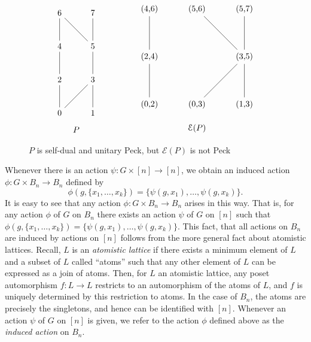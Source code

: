 \documentclass[smallextended]{svjour3}       %
\numberwithin{equation}{section}
\begin{document}
\begin{figure}[h]
\label{fig:dual_not_unimodal}
\[
\begin{tikzpicture}[scale = .7]
  \node (0) at (0,0) {0};
  \node (1) at (2,0) {1};
  \node (2) at (0,2) {2};
  \node (3) at (2,2) {3};
  \node (4) at (0,4) {4};
  \node (5) at (2,4) {5};
  \node (6) at (0,6) {6};
  \node (7) at (2,6) {7};
  \draw (0)--(2);
  \draw (0)--(3);
  \draw (1)--(3);
  \draw (2)--(4);
  \draw (3)--(5);
  \draw (4)--(6);
  \draw (5)--(6);
  \draw (5)--(7);
  \node (8) at (1,-1) {$P$};
\end{tikzpicture}\qquad \hspace{10mm}
\begin{tikzpicture}
  \node (02) at (0,0) {(0,2)};
  \node (03) at (2,0) {(0,3)};
  \node (13) at (4,0) {(1,3)};
  \node (24) at (0,2) {(2,4)};
  \node (35) at (4,2) {(3,5)};
  \node (46) at (0,4) {(4,6)};
  \node (56) at (2,4) {(5,6)};
  \node (57) at (4,4) {(5,7)};
  \draw (02)--(24);
  \draw (03)--(35);
  \draw (13)--(35);
  \draw (24)--(46);
  \draw (35)--(56);
  \draw (35)--(57);
  \node (0) at (2,-1) {$\mathcal{E}(P)$};
\end{tikzpicture}\]
\caption{$P$ is self-dual and unitary Peck, but $\mathcal{E}(P)$ is not Peck}
\end{figure}


\begin{remark}
\label{rem:induced_action_bn}
Whenever there is an action $\psi\colon G \times [n] \rightarrow [n]$, we obtain an induced action $\phi: G \times B_n \rightarrow B_n$ defined by
$$\phi(g,\{x_1,\ldots, x_k\}) = \{\psi(g,x_1),\ldots, \psi(g,x_k)\}.$$
It is easy to see that any action $\phi\colon G \times B_n \rightarrow B_n$ arises in this way. That is, for any action $\phi$ of $G$ on $B_n$ there exists an action $\psi$ of $G$ on $[n]$ such that $\phi(g,\{x_1,\ldots, x_k\}) = \{\psi(g,x_1),\ldots, \psi(g,x_k)\}$. This fact, that all actions on $B_n$ are induced by actions on $[n]$ follows from the more general fact about atomistic lattices. Recall, $L$ is an {\it atomistic lattice} if there exists a minimum element of $L$ and a subset of $L$ called ``atoms'' such that any other element of $L$ can be expressed as a join of atoms. Then, for $L$ an atomistic lattice, any poset automorphism $f\colon L \rightarrow L$ restricts to an automorphism of the atoms of $L$, and $f$ is uniquely determined by this restriction to atoms. In the case of $B_n$, the atoms are precisely the singletons, and hence can be identified with $[n]$.  Whenever an action $\psi$ of $G$ on $[n]$ is given, we refer to the action $\phi$ defined above as the {\it induced action} on $B_n$.
\end{remark}
\end{document}
